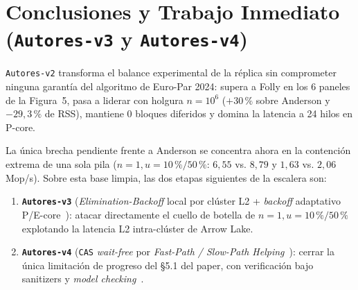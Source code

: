 \documentclass[11pt,a4paper]{article}
\begin{document}
\section{Conclusiones y Trabajo Inmediato (\texttt{Autores-v3} y \texttt{Autores-v4})}

\texttt{Autores-v2} transforma el balance experimental de la réplica sin comprometer ninguna garantía del algoritmo de Euro-Par 2024: supera a Folly en los 6 paneles de la Figura~5, pasa a liderar con holgura $n=10^6$ ($+30\,\%$ sobre Anderson y $-29{,}3\,\%$ de RSS), mantiene 0 bloques diferidos y domina la latencia a 24 hilos en P-core.

La única brecha pendiente frente a Anderson se concentra ahora en la contención extrema de una sola pila ($n=1, u=10\,\% / 50\,\%$: $6{,}55$ vs. $8{,}79$ y $1{,}63$ vs. $2{,}06$\,Mop/s). Sobre esta base limpia, las dos etapas siguientes de la escalera son:
\begin{enumerate}
  \item \textbf{\texttt{Autores-v3}} (\emph{Elimination-Backoff} local por clúster L2 + \emph{backoff} adaptativo P/E-core~\cite{hendler2004elimination,liu2022libasl,ouyang2022coreaware}): atacar directamente el cuello de botella de $n=1, u=10\,\% / 50\,\%$ explotando la latencia L2 intra-clúster de Arrow Lake.
  \item \textbf{\texttt{Autores-v4}} (\texttt{CAS} \emph{wait-free} por \emph{Fast-Path / Slow-Path Helping}~\cite{kogan2012methodology,timnat2014simulation,nikolaev2024crystalline}): cerrar la única limitación de progreso del \S 5.1 del paper, con verificación bajo sanitizers y \emph{model checking}~\cite{kokologiannakis2021genmc}.
\end{enumerate}



\end{document}
